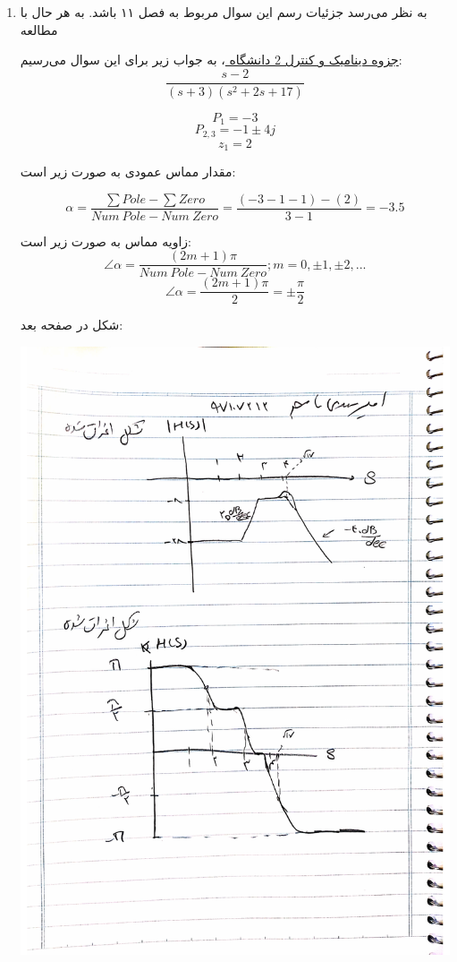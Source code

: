 \documentclass[12pt]{article}
\begin{document}
\begin{enumerate}
	\item 
	به نظر می‌رسد جزئیات رسم این سوال مربوط به فصل ۱۱ باشد. به هر حال با مطالعه
	
	  \href{https://ocw.mit.edu/courses/mechanical-engineering/2-004-dynamics-and-control-ii-spring-2008/}{ جزوه دینامیک و کنترل 2 دانشگاه }
	 ، به جواب زیر برای این سوال می‌رسیم:
	$$
	\frac{s-2}{(s+3)\left(s^{2}+2 s+17\right)}
	$$
	
	$$P_1 = -3$$
	$$P_{2,3} = -1 \pm 4 j$$
	$$z_1 = 2$$
	
	مقدار مماس عمودی به صورت زیر است:
	
	$$\alpha = \frac{\sum Pole - \sum Zero}{Num~ Pole - Num ~Zero} = \frac{(-3 - 1 -1) - (2)}{3 -1} = -3.5$$
	
	زاویه مماس به صورت زیر است:
	$$\angle \alpha = \frac{(2m+1) \pi}{Num~ Pole - Num ~ Zero}; m=0,\pm 1 , \pm 2,...$$
	$$\angle \alpha = \frac{(2m+1) \pi}{2} = \pm \frac{\pi}{2} $$
	
	
	شکل در صفحه بعد:
	
		\includegraphics[page = 2 , width=1.0\textwidth]{images/5.pdf}
	

\end{enumerate}
\end{document}
